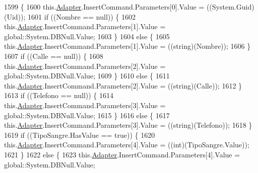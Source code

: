 \begin{DoxyCode}
1599                                     \{
1600             this.\hyperlink{class_proyecto___integrador__3_1_1ds_usuarios_table_adapters_1_1_usuarios_table_adapter_a46252bad9dadbf20130beca25d50b5bc}{Adapter}.InsertCommand.Parameters[0].Value = ((System.Guid)(Uid));
1601             \textcolor{keywordflow}{if} ((Nombre == null)) \{
1602                 this.\hyperlink{class_proyecto___integrador__3_1_1ds_usuarios_table_adapters_1_1_usuarios_table_adapter_a46252bad9dadbf20130beca25d50b5bc}{Adapter}.InsertCommand.Parameters[1].Value = global::System.DBNull.Value;
1603             \}
1604             \textcolor{keywordflow}{else} \{
1605                 this.\hyperlink{class_proyecto___integrador__3_1_1ds_usuarios_table_adapters_1_1_usuarios_table_adapter_a46252bad9dadbf20130beca25d50b5bc}{Adapter}.InsertCommand.Parameters[1].Value = ((string)(Nombre));
1606             \}
1607             \textcolor{keywordflow}{if} ((Calle == null)) \{
1608                 this.\hyperlink{class_proyecto___integrador__3_1_1ds_usuarios_table_adapters_1_1_usuarios_table_adapter_a46252bad9dadbf20130beca25d50b5bc}{Adapter}.InsertCommand.Parameters[2].Value = global::System.DBNull.Value;
1609             \}
1610             \textcolor{keywordflow}{else} \{
1611                 this.\hyperlink{class_proyecto___integrador__3_1_1ds_usuarios_table_adapters_1_1_usuarios_table_adapter_a46252bad9dadbf20130beca25d50b5bc}{Adapter}.InsertCommand.Parameters[2].Value = ((string)(Calle));
1612             \}
1613             \textcolor{keywordflow}{if} ((Telefono == null)) \{
1614                 this.\hyperlink{class_proyecto___integrador__3_1_1ds_usuarios_table_adapters_1_1_usuarios_table_adapter_a46252bad9dadbf20130beca25d50b5bc}{Adapter}.InsertCommand.Parameters[3].Value = global::System.DBNull.Value;
1615             \}
1616             \textcolor{keywordflow}{else} \{
1617                 this.\hyperlink{class_proyecto___integrador__3_1_1ds_usuarios_table_adapters_1_1_usuarios_table_adapter_a46252bad9dadbf20130beca25d50b5bc}{Adapter}.InsertCommand.Parameters[3].Value = ((string)(Telefono));
1618             \}
1619             \textcolor{keywordflow}{if} ((TipoSangre.HasValue == \textcolor{keyword}{true})) \{
1620                 this.\hyperlink{class_proyecto___integrador__3_1_1ds_usuarios_table_adapters_1_1_usuarios_table_adapter_a46252bad9dadbf20130beca25d50b5bc}{Adapter}.InsertCommand.Parameters[4].Value = ((int)(TipoSangre.Value));
1621             \}
1622             \textcolor{keywordflow}{else} \{
1623                 this.\hyperlink{class_proyecto___integrador__3_1_1ds_usuarios_table_adapters_1_1_usuarios_table_adapter_a46252bad9dadbf20130beca25d50b5bc}{Adapter}.InsertCommand.Parameters[4].Value = global::System.DBNull.Value;

\end{DoxyCode}

